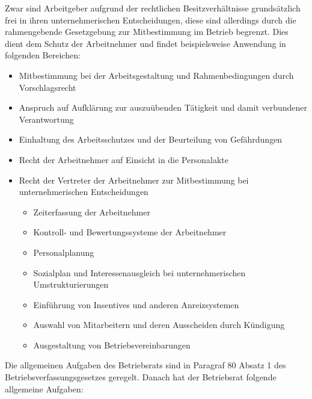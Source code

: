 Zwar sind Arbeitgeber aufgrund der rechtlichen Besitzverhältnisse grundsätzlich frei in ihren unternehmerischen Entscheidungen, diese sind allerdings durch die rahmengebende Gesetzgebung zur Mitbestimmung im Betrieb begrenzt. Dies dient dem Schutz der Arbeitnehmer und findet beispielsweise Anwendung in folgenden Bereichen: 
\begin{itemize}
	\item Mitbestimmung bei der Arbeitsgestaltung und Rahmenbedingungen durch Vorschlagsrecht
	\item Anspruch auf Aufklärung zur auszuübenden Tätigkeit und damit verbundener Verantwortung
	\item Einhaltung des Arbeitsschutzes und der Beurteilung von Gefährdungen
	\item Recht der Arbeitnehmer auf Einsicht in die Personalakte
	\item Recht der Vertreter der Arbeitnehmer zur Mitbestimmung bei unternehmerischen Entscheidungen
	\begin{itemize}
		\item Zeiterfassung der Arbeitnehmer
		\item Kontroll- und Bewertungssysteme der Arbeitnehmer
		\item Personalplanung
		\item Sozialplan und Interessenausgleich bei unternehmerischen Umstrukturierungen
		\item Einführung von Insentives und anderen Anreizsystemen
		\item Auswahl von Mitarbeitern und deren Ausscheiden durch Kündigung
		\item Ausgestaltung von Betriebsvereinbarungen
	\end{itemize}
\end{itemize}
Die allgemeinen Aufgaben des Betriebsrats sind in Paragraf 80 Absatz 1 des Betriebsverfassungsgesetzes geregelt. Danach hat der Betriebsrat folgende allgemeine Aufgaben:

